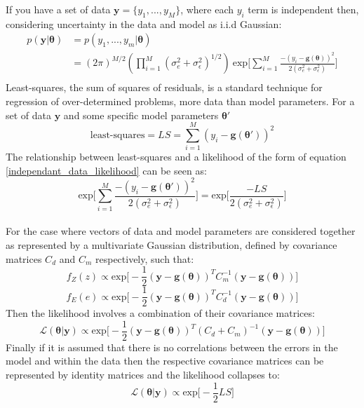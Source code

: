 If you have a set of data $\bm{y} = \{y_1,...,y_M\}$, where each $y_i$ term is independent then, considering uncertainty in the data and model as i.i.d Gaussian:
\begin{equation}
\begin{split}
p(\bm{y}|\bm{\theta}) &= p(y_1,...,y_m|\bm{\theta})\\
&= (2\pi)^{M/2}(\prod_{i = 1}^{M}(\sigma_{e}^2+\sigma_{\epsilon}^2)^{1/2})\ \text{exp}\bigg[\sum_{i = 1}^{M}\frac{-(y_i-\bm{g}({\bm{\theta}}))^2}{2(\sigma_{e}^2+\sigma_{\epsilon}^2)}\bigg]\\
\label{independant_data_likelihood}
\end{split}
\end{equation}
Least-squares, the sum of squares of residuals, is a standard technique for regression of over-determined problems, more data than model parameters. For a set of data $\bm{y}$ and some specific model parameters $\bm{\theta'}$
\begin{equation}
\text{least-squares} = LS = \sum_{i = 1}^{M} (y_i - \bm{g}(\bm{\theta'}))^2
\end{equation}
The relationship between least-squares and a likelihood of the form of equation \ref{independant_data_likelihood} can be seen as:
\begin{equation}
\text{exp}\bigg[\sum_{i = 1}^{M}\frac{-(y_i-\bm{g}({\bm{\theta'}}))^2}{2(\sigma_{e}^2+\sigma_{\epsilon}^2)}\bigg] = \text{exp}\bigg[\frac{-LS}{2(\sigma_{e}^2+\sigma_{\epsilon}^2)}\bigg]
\end{equation}\\

For the case where vectors of data and model parameters are considered together as represented by a multivariate Gaussian distribution, defined by covariance matrices $C_d$ and $C_m$ respectively, such that:
\begin{equation}
f_Z(z) \propto \text{exp}\bigg[-\frac{1}{2}(\bm{y}-\bm{g}(\bm{\theta}))^TC_m^{-1}(\bm{y}-\bm{g}(\bm{\theta}))\bigg]
\end{equation}
\begin{equation}
f_E(e) \propto \text{exp}\bigg[-\frac{1}{2}(\bm{y}-\bm{g}(\bm{\theta}))^TC_d^{-1}(\bm{y}-\bm{g}(\bm{\theta}))\bigg]
\end{equation}
Then the likelihood involves a combination of their covariance matrices:
\begin{equation}
\mathcal{L}(\bm{\theta}|\bm{y}) \propto \text{exp}\bigg[-\frac{1}{2}(\bm{y}-\bm{g}(\bm{\theta}))^T(C_d+C_m)^{-1}(\bm{y}-\bm{g}(\bm{\theta}))\bigg]
\end{equation}
Finally if it is assumed that there is no correlations between the errors in the model and within the data then the respective covariance matrices can be represented by identity matrices and the likelihood collapses to:
\begin{equation}
\mathcal{L}(\bm{\theta}|\bm{y}) \propto \text{exp}\bigg[-\frac{1}{2}LS\bigg]
\end{equation}